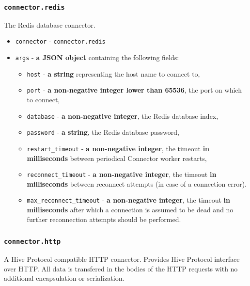 \documentclass[a4paper]{article}
\begin{document}
\subsubsection{\texttt{connector.redis}}
\label{sec-9-4-1}

The Redis database connector.


\begin{itemize}
\item \texttt{connector} - \texttt{connector.redis}
\item \texttt{args} - \textbf{a JSON object} containing the following fields:
\begin{itemize}
\item \texttt{host} - \textbf{a string} representing the host name to connect to,
\item \texttt{port} - \textbf{a non-negative integer lower than 65536}, the port on which to connect,
\item \texttt{database} - \textbf{a non-negative integer}, the Redis database index,
\item \texttt{password} - \textbf{a string}, the Redis database password,
\item \texttt{restart\_timeout} - \textbf{a non-negative integer}, the timeout \textbf{in milliseconds} between periodical Connector worker restarts,
\item \texttt{reconnect\_timeout} - \textbf{a non-negative integer}, the timeout \textbf{in milliseconds} between reconnect attempts (in case of a connection error).
\item \texttt{max\_reconnect\_timeout} - \textbf{a non-negative integer}, the timeout \textbf{in milliseconds} after which a connection is assumed to be dead and no further reconnection attempts should be performed.
\end{itemize}
\end{itemize}
\subsubsection{\texttt{connector.http}}
\label{sec-9-4-2}
\label{ref-cp_connectors}

A Hive Protocol compatible HTTP connector. Provides Hive Protocol interface over HTTP. All data is transfered in the bodies of the HTTP requests with no additional encapsulation or serialization.
\end{document}
